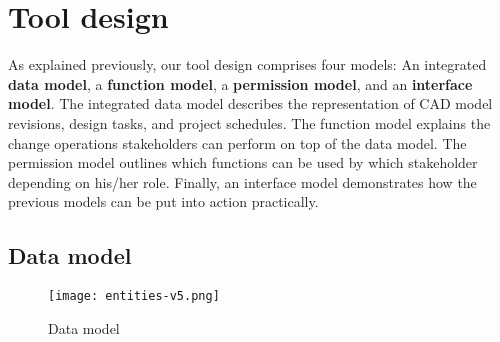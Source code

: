 \section{Tool design}
    \label{sec:contribution}

    As explained previously, our tool design comprises four models: An integrated \textbf{data model}, a \textbf{function model}, a \textbf{permission model}, and an \textbf{interface model}.
    The integrated data model describes the representation of CAD model revisions, design tasks, and project schedules.
    The function model explains the change operations stakeholders can perform on top of the data model.
    The permission model outlines which functions can be used by which stakeholder depending on his/her role.
    Finally, an interface model demonstrates how the previous models can be put into action practically.

    \subsection*{Data model}

    \begin{figure*}[ht]
        \centering
        \texttt{[image: entities-v5.png]}
        \caption{Data model}
        \label{fig: datamodel}
    \end{figure*}


